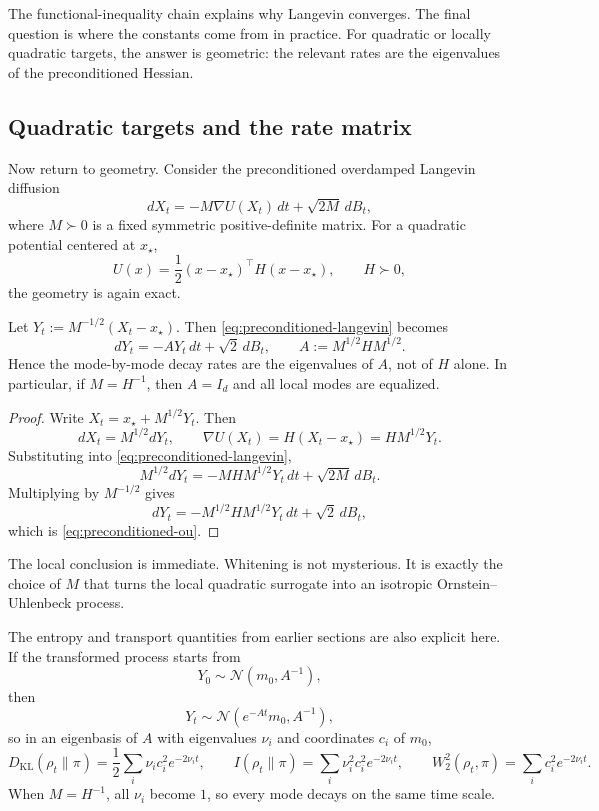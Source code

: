 \documentclass[11pt]{article}
\begin{document}
The functional-inequality chain explains why Langevin converges.
The final question is where the constants come from in practice.
For quadratic or locally quadratic targets, the answer is geometric: the relevant rates are the eigenvalues of the preconditioned Hessian.

\subsection{Quadratic targets and the rate matrix}
\label{subsec:preconditioning-quadratic}

Now return to geometry.
Consider the preconditioned overdamped Langevin diffusion
\begin{equation}
  dX_t=-M\nabla U(X_t)\,dt+\sqrt{2M}\,dB_t,
  \label{eq:preconditioned-langevin}
\end{equation}
where $M\succ 0$ is a fixed symmetric positive-definite matrix.
For a quadratic potential centered at $x_\star$,
\[
U(x)=\frac12 (x-x_\star)^\top H(x-x_\star),
\qquad
H\succ 0,
\]
the geometry is again exact.

\begin{proposition}
\label{prop:preconditioned-rate-matrix}
Let $Y_t:=M^{-1/2}(X_t-x_\star)$.
Then \eqref{eq:preconditioned-langevin} becomes
\begin{equation}
  dY_t=-A Y_t\,dt+\sqrt{2}\,dB_t,
  \qquad
  A:=M^{1/2}HM^{1/2}.
  \label{eq:preconditioned-ou}
\end{equation}
Hence the mode-by-mode decay rates are the eigenvalues of $A$, not of $H$ alone.
In particular, if $M=H^{-1}$, then $A=I_d$ and all local modes are equalized.
\end{proposition}

\begin{proof}
Write $X_t=x_\star+M^{1/2}Y_t$.
Then
\[
dX_t=M^{1/2}dY_t,
\qquad
\nabla U(X_t)=H(X_t-x_\star)=HM^{1/2}Y_t.
\]
Substituting into \eqref{eq:preconditioned-langevin},
\[
M^{1/2}dY_t=-MHM^{1/2}Y_t\,dt+\sqrt{2M}\,dB_t.
\]
Multiplying by $M^{-1/2}$ gives
\[
dY_t=-M^{1/2}HM^{1/2}Y_t\,dt+\sqrt{2}\,dB_t,
\]
which is \eqref{eq:preconditioned-ou}.%
\end{proof}

The local conclusion is immediate.
Whitening is not mysterious.
It is exactly the choice of $M$ that turns the local quadratic surrogate into an isotropic Ornstein--Uhlenbeck process.

The entropy and transport quantities from earlier sections are also explicit here.
If the transformed process starts from
\[
Y_0\sim \mathcal{N}(m_0,A^{-1}),
\]
then
\[
Y_t\sim \mathcal{N}(e^{-At}m_0,A^{-1}),
\]
so in an eigenbasis of $A$ with eigenvalues $\nu_i$ and coordinates $c_i$ of $m_0$,
\begin{equation}
  D_{\mathrm{KL}}(\rho_t\|\pi)
  =
  \frac12\sum_i \nu_i c_i^2 e^{-2\nu_i t},
  \qquad
  I(\rho_t\|\pi)
  =
  \sum_i \nu_i^2 c_i^2 e^{-2\nu_i t},
  \qquad
  W_2^2(\rho_t,\pi)
  =
  \sum_i c_i^2 e^{-2\nu_i t}.
  \label{eq:preconditioned-decay-formulas}
\end{equation}
When $M=H^{-1}$, all $\nu_i$ become $1$, so every mode decays on the same time scale.
\end{document}
